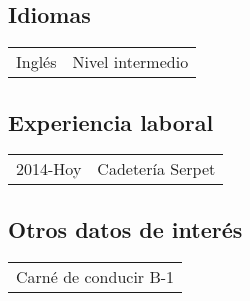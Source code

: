 \documentclass[12pt]{article}
\begin{document}
\subsection*{Idiomas}
\begin{tabular}{l l}
  Inglés&Nivel intermedio\\
\end{tabular}
\subsection*{Experiencia laboral}
\begin{tabular}{l l}
  2014-Hoy&Cadetería Serpet\\
\end{tabular}
\subsection*{Otros datos de interés}
\begin{tabular}{l}
  Carné de conducir B-1\\
\end{tabular}
\end{document}
